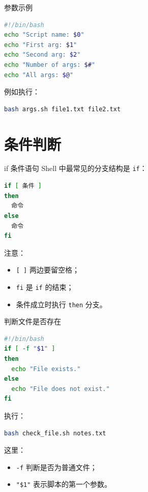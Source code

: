 \documentclass[aspectratio=169]{beamer}
\begin{document}
\begin{frame}[fragile]{参数示例}
\begin{lstlisting}[language=bash]
#!/bin/bash
echo "Script name: $0"
echo "First arg: $1"
echo "Second arg: $2"
echo "Number of args: $#"
echo "All args: $@"
\end{lstlisting}

例如执行：
\begin{lstlisting}[language=bash]
bash args.sh file1.txt file2.txt
\end{lstlisting}
\end{frame}

\section{条件判断}

\begin{frame}[fragile]{if 条件语句}
Shell 中最常见的分支结构是 \texttt{if}：

\begin{lstlisting}[language=bash]
if [ 条件 ]
then
  命令
else
  命令
fi
\end{lstlisting}

注意：
\begin{itemize}
  \item \texttt{[ ]} 两边要留空格；
  \item \texttt{fi} 是 \texttt{if} 的结束；
  \item 条件成立时执行 \texttt{then} 分支。
\end{itemize}
\end{frame}

\begin{frame}[fragile]{判断文件是否存在}
\begin{lstlisting}[language=bash]
#!/bin/bash
if [ -f "$1" ]
then
  echo "File exists."
else
  echo "File does not exist."
fi
\end{lstlisting}

执行：
\begin{lstlisting}[language=bash]
bash check_file.sh notes.txt
\end{lstlisting}

这里：
\begin{itemize}
  \item \texttt{-f} 判断是否为普通文件；
  \item \texttt{"\$1"} 表示脚本的第一个参数。
\end{itemize}
\end{frame}
\end{document}
